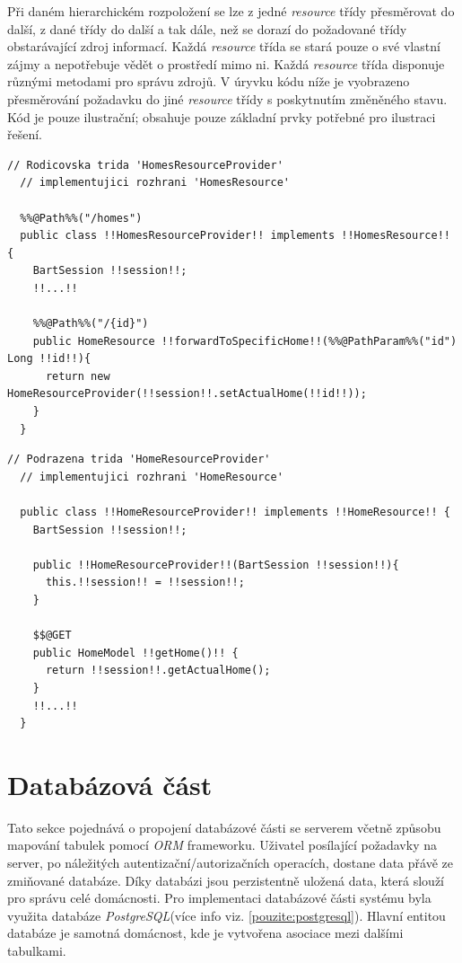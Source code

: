 Při daném hierarchickém rozpoložení se lze z jedné \emph{resource} třídy přesměrovat do další, z dané třídy do další a tak dále, než se dorazí do požadované třídy obstarávající zdroj informací.
Každá \emph{resource} třída se stará pouze o své vlastní zájmy a nepotřebuje vědět o prostředí mimo ni.
Každá \emph{resource} třída disponuje různými metodami pro správu zdrojů.
V úryvku kódu níže je vyobrazeno přesměrování požadavku do jiné \emph{resource} třídy s poskytnutím změněného stavu.
Kód je pouze ilustrační; obsahuje pouze základní prvky potřebné pro ilustraci řešení.
\newpage
\begin{lstlisting}[style=JavaStyle, caption={Ukázka přesměrování požadavku}]
  // Rodicovska trida 'HomesResourceProvider'
  // implementujici rozhrani 'HomesResource'

  %%@Path%%("/homes")
  public class !!HomesResourceProvider!! implements !!HomesResource!! {
    BartSession !!session!!;
    !!...!!

    %%@Path%%("/{id}")
    public HomeResource !!forwardToSpecificHome!!(%%@PathParam%%("id") Long !!id!!){
      return new HomeResourceProvider(!!session!!.setActualHome(!!id!!));
    }
  }
\end{lstlisting}

\begin{lstlisting}[style=JavaStyle, caption={Ukázka zpracování požadavku z přesměrované třídy}]
  // Podrazena trida 'HomeResourceProvider'
  // implementujici rozhrani 'HomeResource'

  public class !!HomeResourceProvider!! implements !!HomeResource!! {
    BartSession !!session!!;

    public !!HomeResourceProvider!!(BartSession !!session!!){
      this.!!session!! = !!session!!;
    }

    $$@GET
    public HomeModel !!getHome()!! {
      return !!session!!.getActualHome();
    }
    !!...!!
  }
\end{lstlisting}

\newpage
\section{Databázová část}
\label{impl:databaze}
Tato sekce pojednává o propojení databázové části se serverem včetně způsobu mapování tabulek pomocí \emph{ORM} frameworku.
Uživatel posílající požadavky na server, po náležitých autentizační/autorizačních operacích, dostane data přávě ze zmiňované databáze.
Díky databázi jsou perzistentně uložená data, která slouží pro správu celé domácnosti.
Pro implementaci databázové části systému byla využita databáze \emph{PostgreSQL}(více info viz. \ref{pouzite:postgresql}).
Hlavní entitou databáze je samotná domácnost, kde je vytvořena asociace mezi dalšími tabulkami.


